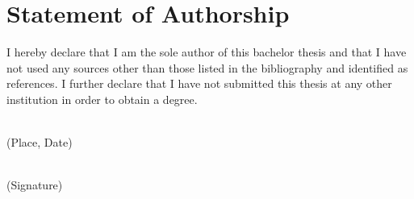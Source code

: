 \chapter*{Statement of Authorship}
I hereby declare that I am the sole author of this bachelor thesis and that I have not used any sources other than those listed in the bibliography and identified as references.
I further declare that I have not submitted this thesis at any other institution in order to obtain a degree.

\vspace{1cm}

\noindent
\begin{minipage}{.40\textwidth}
\small
\underline{\hspace{.85\textwidth}}\\
(Place, Date)
\end{minipage}
\begin{minipage}{.40\textwidth}
\small
\underline{\hspace{.85\textwidth}}\\
(Signature)
\end{minipage}

